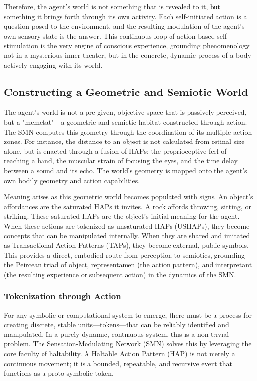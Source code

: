 Therefore, the agent's world is not something that is revealed to it, but something it brings forth through its own activity. Each self-initiated action is a question posed to the environment, and the resulting modulation of the agent's own sensory state is the answer. This continuous loop of action-based self-stimulation is the very engine of conscious experience, grounding phenomenology not in a mysterious inner theater, but in the concrete, dynamic process of a body actively engaging with its world.

\subsection*{Constructing a Geometric and Semiotic World}
The agent's world is not a pre-given, objective space that is passively perceived, but a "memetat"—a geometric and semiotic habitat constructed through action. The SMN computes this geometry through the coordination of its multiple action zones. For instance, the distance to an object is not calculated from retinal size alone, but is enacted through a fusion of HAPs: the proprioceptive feel of reaching a hand, the muscular strain of focusing the eyes, and the time delay between a sound and its echo. The world's geometry is mapped onto the agent's own bodily geometry and action capabilities.

Meaning arises as this geometric world becomes populated with signs. An object's affordances are the saturated HAPs it invites. A rock affords throwing, sitting, or striking. These saturated HAPs are the object's initial meaning for the agent. When these actions are tokenized as unsaturated HAPs (USHAPs), they become concepts that can be manipulated internally. When they are shared and imitated as Transactional Action Patterns (TAPs), they become external, public symbols. This provides a direct, embodied route from perception to semiotics, grounding the Peircean triad of object, representamen (the action pattern), and interpretant (the resulting experience or subsequent action) in the dynamics of the SMN.

\subsubsection*{Tokenization through Action}
For any symbolic or computational system to emerge, there must be a process for creating discrete, stable units—tokens—that can be reliably identified and manipulated. In a purely dynamic, continuous system, this is a non-trivial problem. The Sensation-Modulating Network (SMN) solves this by leveraging the core faculty of haltability. A Haltable Action Pattern (HAP) is not merely a continuous movement; it is a bounded, repeatable, and recursive event that functions as a proto-symbolic token.

